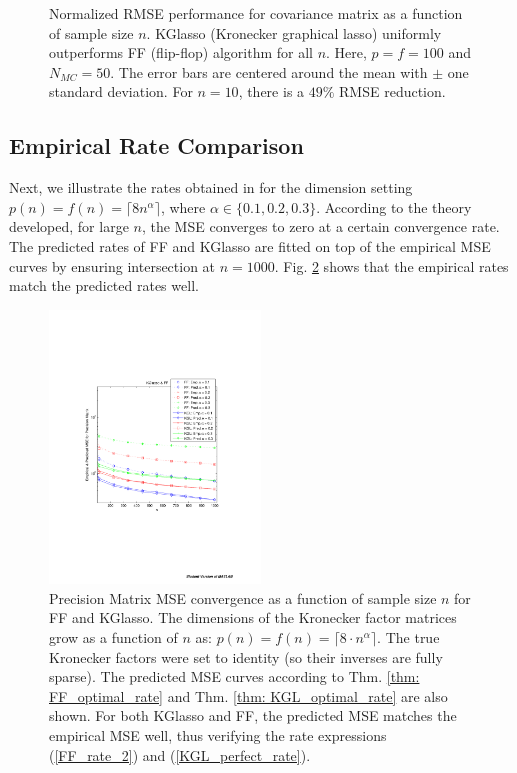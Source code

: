 \documentclass[journal,11pt,draftcls,onecolumn]{IEEEtran}
\begin{document}
\begin{figure}[htp]
	\caption{Normalized RMSE performance for covariance matrix as a function of sample size $n$. KGlasso (Kronecker graphical lasso) uniformly outperforms FF (flip-flop) algorithm for all $n$. Here, $p=f=100$ and $N_{MC}=50$. The error bars are centered around the mean with $\pm$ one standard deviation. For $n=10$, there is a $49 \%$ RMSE reduction. }
	\label{fig: sim4_frob_cov}
\end{figure}


\subsection{Empirical Rate Comparison}
Next, we illustrate the rates obtained in for the dimension setting $p(n)=f(n)= \lceil 8 n^\alpha \rceil$, where $\alpha\in\{0.1,0.2,0.3\}$. According to the theory developed, for large $n$, the MSE converges to zero at a certain convergence rate. The predicted rates of FF and KGlasso are fitted on top of the empirical MSE curves by ensuring intersection at $n=1000$. Fig. \ref{fig: KGlasso_FF_curves} shows that the empirical rates match the predicted rates well.
\begin{figure}[htp]
	\centering
		\includegraphics[width=0.50\textwidth]{./Sim/KGlasso_FF_sim_19-Mar-2012-20-19_summary.pdf}
	\caption{ Precision Matrix MSE convergence as a function of sample size $n$ for FF and KGlasso. The dimensions of the Kronecker factor matrices grow as a function of $n$ as: $p(n)=f(n)=\lceil 8 \cdot n^\alpha \rceil$. The true Kronecker factors were set to identity (so their inverses are fully sparse). The predicted MSE curves according to Thm. \ref{thm: FF_optimal_rate} and Thm. \ref{thm: KGL_optimal_rate} are also shown. For both KGlasso and FF, the predicted MSE matches the empirical MSE well, thus verifying the rate expressions (\ref{FF_rate_2}) and (\ref{KGL_perfect_rate}). }
	\label{fig: KGlasso_FF_curves}
\end{figure}
\end{document}
